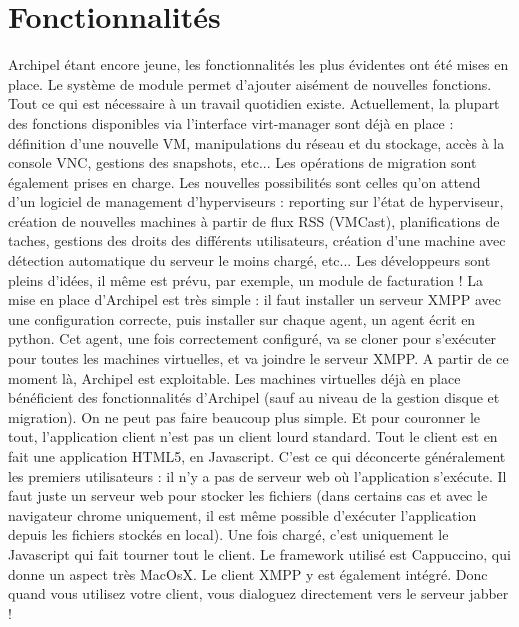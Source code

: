     \section{Fonctionnalités}
Archipel étant encore jeune, les fonctionnalités les plus évidentes ont été mises en place. Le système de
module permet d'ajouter aisément de nouvelles fonctions. Tout ce qui est nécessaire à un travail
quotidien existe.\newline
Actuellement, la plupart des fonctions disponibles via l'interface virt-manager sont déjà en place :
définition d'une nouvelle VM, manipulations du réseau et du stockage, accès à la console VNC, gestions
des snapshots, etc... Les opérations de migration sont également prises en charge. Les nouvelles
possibilités sont celles qu'on attend d'un logiciel de management d'hyperviseurs : reporting sur l'état de
hyperviseur, création de nouvelles machines à partir de flux RSS (VMCast), planifications de taches,
gestions des droits des différents utilisateurs, création d'une machine avec détection automatique du
serveur le moins chargé, etc... Les développeurs sont pleins d'idées, il même est prévu, par exemple, un
module de facturation !\newline
La mise en place d'Archipel est très simple : il faut installer un serveur XMPP avec une configuration
correcte, puis installer sur chaque agent, un agent écrit en python. Cet agent, une fois correctement
configuré, va se cloner pour s’exécuter pour toutes les machines virtuelles, et va joindre le serveur XMPP.
A partir de ce moment là, Archipel est exploitable. Les machines virtuelles déjà en place bénéficient des
fonctionnalités d'Archipel (sauf au niveau de la gestion disque et migration). On ne peut pas faire
beaucoup plus simple.\newline
Et pour couronner le tout, l'application client n'est pas un client lourd standard. Tout le client est en fait
une application HTML5, en Javascript. C'est ce qui déconcerte généralement les premiers utilisateurs : il
n'y a pas de serveur web où l'application s’exécute. Il faut juste un serveur web pour stocker les fichiers
(dans certains cas et avec le navigateur chrome uniquement, il est même possible d’exécuter l'application
depuis les fichiers stockés en local). Une fois chargé, c'est uniquement le Javascript qui fait tourner tout le
client. Le framework utilisé est Cappuccino, qui donne un aspect très MacOsX. Le client XMPP y est
également intégré. Donc quand vous utilisez votre client, vous dialoguez directement vers le serveur
jabber !

